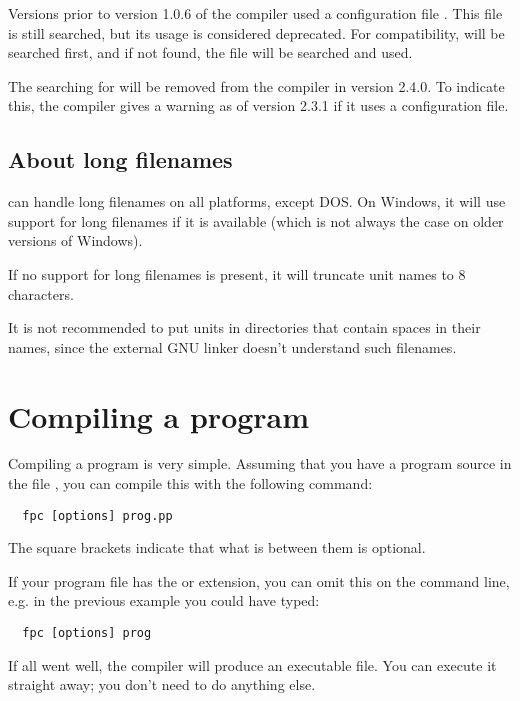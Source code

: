 Versions prior to version 1.0.6 of the compiler used a configuration
file . This file is still searched, but its usage 
is considered deprecated. For compatibility,  will
be searched first, and if not found, the file 
will be searched and used.

\begin{remark}
The searching for  will be removed from the compiler
in version 2.4.0. To indicate this, the compiler gives a warning as of
version 2.3.1 if it uses a  configuration file.
\end{remark}


\subsection{About long filenames}
\fpc can handle long filenames on all platforms, except DOS.
On Windows, it will use support for long filenames if it is available
(which is not always the case on older versions of Windows).

If no support for long filenames is present, it will truncate unit names
to 8 characters.

It is not recommended to put units in directories that contain spaces in
their names, since the external GNU linker doesn't understand such filenames.

\section{Compiling a program}
Compiling a program is very simple. Assuming that you have a program source
in the file , you can compile this with the following command:
\begin{verbatim}
  fpc [options] prog.pp
\end{verbatim}
The square brackets \var{[\ ]} indicate that what is between them is optional.

If your program file has the  or  extension,
you can omit this on the command line, e.g. in the previous example you
could have typed:
\begin{verbatim}
  fpc [options] prog
\end{verbatim}

If all went well, the compiler will produce an executable file. You can execute 
it straight away; you don't need to do anything else. 

